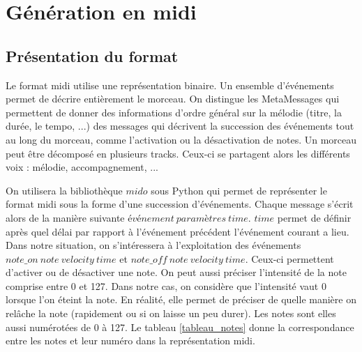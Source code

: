 \section{Génération en midi}

\subsection{Présentation du format}

Le format midi utilise une représentation binaire. Un ensemble d'événements permet de décrire entièrement le morceau. On distingue les MetaMessages qui permettent de donner des informations d'ordre général sur la mélodie (titre, la durée, le tempo, ...) des messages qui décrivent la succession des événements tout au long du morceau, comme l'activation ou la désactivation de notes. Un morceau peut être décomposé en plusieurs tracks. Ceux-ci se partagent alors les différents voix : mélodie, accompagnement, ... 

On utilisera la bibliothèque $mido$ sous Python qui permet de représenter le format midi sous la forme d'une succession d'événements. Chaque message s'écrit alors de la manière suivante $événement\ paramètres\ time$. $time$ permet de définir après quel délai par rapport à l'événement précédent l'événement courant a lieu. Dans notre situation, on s'intéressera à l'exploitation des événements $note\_on\ note\ velocity\ time$ et $note\_off\ note\ velocity\ time$. Ceux-ci permettent d'activer ou de désactiver une note. On peut aussi préciser l'intensité de la note comprise entre 0 et 127. Dans notre cas, on considère que l'intensité vaut 0 lorsque l'on éteint la note. En réalité, elle permet de préciser de quelle manière on relâche la note (rapidement ou si on laisse un peu durer). Les notes sont elles aussi numérotées de 0 à 127. Le tableau \ref{tableau_notes} donne la correspondance entre les notes et leur numéro dans la représentation midi.

